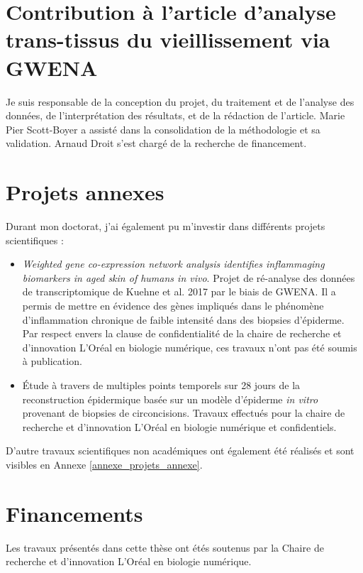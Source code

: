 \section{Contribution à l'article d'analyse trans-tissus du vieillissement via GWENA}

Je suis responsable de la conception du projet, du traitement et de l'analyse des données, de l'interprétation des résultats, et de la rédaction de l'article. Marie Pier Scott-Boyer a assisté dans la consolidation de la méthodologie et sa validation. Arnaud Droit s'est chargé de la recherche de financement.


\section{Projets annexes}

Durant mon doctorat, j'ai également pu m'investir dans différents projets scientifiques :
\begin{itemize}
    \item \textit{Weighted gene co-expression network analysis identifies inflammaging biomarkers in aged skin of humans in vivo}. Projet de ré-analyse des données de transcriptomique de Kuehne et al. 2017 par le biais de GWENA. Il a permis de mettre en évidence des gènes impliqués dans le phénomène d'inflammation chronique de faible intensité dans des biopsies d'épiderme. Par respect envers la clause de confidentialité de la chaire de recherche et d'innovation L'Oréal en biologie numérique, ces travaux n'ont pas été soumis à publication.
    \item Étude à travers de multiples points temporels sur 28 jours de la reconstruction épidermique basée sur un modèle d'épiderme \textit{in vitro} provenant de biopsies de circoncisions. Travaux effectués pour la chaire de recherche et d'innovation L'Oréal en biologie numérique et confidentiels.
\end{itemize}

D'autre travaux scientifiques non académiques ont également été réalisés et sont visibles en Annexe \ref{annexe_projets_annexe}.



\section{Financements}

Les travaux présentés dans cette thèse ont étés soutenus par la Chaire de recherche et d'innovation L'Oréal en biologie numérique.

